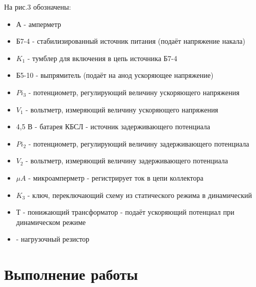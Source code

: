\documentclass[a4paper, 12pt]{article}
\begin{document}
На рис.3 обозначены:
\begin{itemize}
    \item А - амперметр
    \item Б7-4 - стабилизированный источник питания (подаёт напряжение накала)
    \item $K_1$ - тумблер для включения в цепь источника Б7-4
    \item Б5-10 - выпрямитель (подаёт на анод ускоряющее напряжение)
    \item $Pi_3$ - потенциометр, регулирующий величину ускоряющего напряжения
    \item $V_1$ - вольтметр, измеряющий величину ускоряющего напряжения
    \item 4,5 В - батарея КБСЛ - источник задерживающего потенциала
    \item $Pi_2$ - потенциометр, регулирующий величину задерживающего потенциала
    \item $V_2$ - вольтметр, измеряющий величину задерживающего потенциала
    \item $\mu A$ - микроамперметр - регистрирует ток в цепи коллектора
    \item $K_3$ - ключ, переключающий схему из статического режима в динамический
    \item Т - понижающий трансформатор - подаёт ускоряющий потенциал при динамическом режиме
    \item - нагрузочный резистор
\end{itemize}

\section{Выполнение работы}
\end{document}
